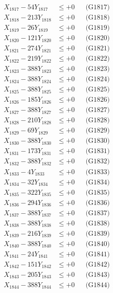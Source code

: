 \documentclass[a4paper,10pt]{article}
\begin{document}
{\begin{align}
X_{1817} - 54Y_{1817} &\leq +0 && \text{(G1817)} \\
X_{1818} - 213Y_{1818} &\leq +0 && \text{(G1818)} \\
X_{1819} - 26Y_{1819} &\leq +0 && \text{(G1819)} \\
X_{1820} - 121Y_{1820} &\leq +0 && \text{(G1820)} \\
\allowbreak
X_{1821} - 274Y_{1821} &\leq +0 && \text{(G1821)} \\
X_{1822} - 219Y_{1822} &\leq +0 && \text{(G1822)} \\
X_{1823} - 388Y_{1823} &\leq +0 && \text{(G1823)} \\
X_{1824} - 388Y_{1824} &\leq +0 && \text{(G1824)} \\
X_{1825} - 388Y_{1825} &\leq +0 && \text{(G1825)} \\
X_{1826} - 185Y_{1826} &\leq +0 && \text{(G1826)} \\
X_{1827} - 388Y_{1827} &\leq +0 && \text{(G1827)} \\
X_{1828} - 210Y_{1828} &\leq +0 && \text{(G1828)} \\
X_{1829} - 69Y_{1829} &\leq +0 && \text{(G1829)} \\
X_{1830} - 388Y_{1830} &\leq +0 && \text{(G1830)} \\
\allowbreak
X_{1831} - 173Y_{1831} &\leq +0 && \text{(G1831)} \\
X_{1832} - 388Y_{1832} &\leq +0 && \text{(G1832)} \\
X_{1833} - 4Y_{1833} &\leq +0 && \text{(G1833)} \\
X_{1834} - 32Y_{1834} &\leq +0 && \text{(G1834)} \\
X_{1835} - 322Y_{1835} &\leq +0 && \text{(G1835)} \\
X_{1836} - 294Y_{1836} &\leq +0 && \text{(G1836)} \\
X_{1837} - 388Y_{1837} &\leq +0 && \text{(G1837)} \\
X_{1838} - 388Y_{1838} &\leq +0 && \text{(G1838)} \\
X_{1839} - 216Y_{1839} &\leq +0 && \text{(G1839)} \\
X_{1840} - 388Y_{1840} &\leq +0 && \text{(G1840)} \\
\allowbreak
X_{1841} - 24Y_{1841} &\leq +0 && \text{(G1841)} \\
X_{1842} - 151Y_{1842} &\leq +0 && \text{(G1842)} \\
X_{1843} - 205Y_{1843} &\leq +0 && \text{(G1843)} \\
X_{1844} - 388Y_{1844} &\leq +0 && \text{(G1844)} \\

\end{align}}
\end{document}
